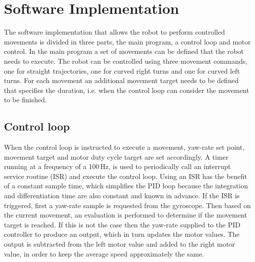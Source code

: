 


\section{Software Implementation}
\label{sec:dai_software_implementation}

The software implementation that allows the robot to perform controlled movements is divided in three parts, the main program, a control loop and motor control.
In the main program a set of movements can be defined that the robot needs to execute.
The robot can be controlled using three movement commands, one for straight trajectories, one for curved right turns and one for curved left turns.
For each movement an additional movement target needs to be defined that specifies the duration, i.e. when the control loop can consider the movement to be finished.

\subsection{Control loop}

When the control loop is instructed to execute a movement, yaw-rate set point, movement target and motor duty cycle target are set accordingly.
A timer running at a frequency of a 100\,Hz, is used to periodically call an interrupt service routine (ISR) and execute the control loop.
Using an ISR has the benefit of a constant sample time, which simplifies the PID loop because the integration and differentiation time are also constant and known in advance.
If the ISR is triggered, first a yaw-rate sample is requested from the gyroscope.
Then based on the current movement, an evaluation is performed to determine if the movement target is reached.
If this is not the case then the yaw-rate supplied to the PID controller to produce an output, which in turn updates the motor values.
The output is subtracted from the left motor value and added to the right motor value, in order to keep the average speed approximately the same.

